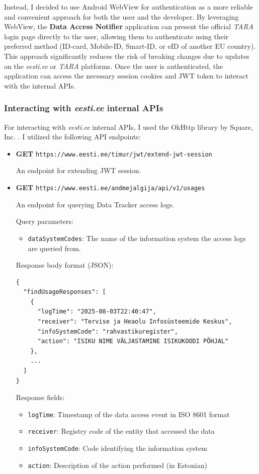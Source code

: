 Instead, I decided to use Android WebView for authentication as a more reliable and convenient approach for both the user and the developer. By leveraging WebView, the \textbf{Data Access Notifier} application can present the official \textit{TARA} login page directly to the user, allowing them to authenticate using their preferred method (ID-card, Mobile-ID, Smart-ID, or eID of another EU country). This approach significantly reduces the risk of breaking changes due to updates on the \textit{eesti.ee} or \textit{TARA} platforms. Once the user is authenticated, the application can access the necessary session cookies and JWT token to interact with the internal APIs.

\subsubsection{Interacting with \textit{eesti.ee} internal APIs}
For interacting with \textit{eesti.ee} internal APIs, I used the OkHttp library by Square, Inc. \cite{okhttp-library}. I utilized the following API endpoints:

\begin{itemize}
    \item \textbf{GET} \texttt{https://www.eesti.ee/timur/jwt/extend-jwt-session}
    
    An endpoint for extending JWT session.
    
    \item \textbf{GET} \texttt{https://www.eesti.ee/andmejalgija/api/v1/usages}
    
    An endpoint for querying Data Tracker access logs.
    
    Query parameters:
    \begin{itemize}
        \item \texttt{dataSystemCodes}: The name of the information system the access logs are queried from.
    \end{itemize}
    
    \samepage
    Response body format (JSON):
    \begin{small}
    \begin{verbatim}
{
  "findUsageResponses": [
    {
      "logTime": "2025-08-03T22:40:47",
      "receiver": "Tervise ja Heaolu Infosüsteemide Keskus",
      "infoSystemCode": "rahvastikuregister",
      "action": "ISIKU NIME VÄLJASTAMINE ISIKUKOODI PÕHJAL"
    },
    ...
  ]
}
    \end{verbatim}
    \end{small}
    
    Response fields:
    \begin{itemize}
        \item \texttt{logTime}: Timestamp of the data access event in ISO 8601 format
        \item \texttt{receiver}: Registry code of the entity that accessed the data
        \item \texttt{infoSystemCode}: Code identifying the information system
        \item \texttt{action}: Description of the action performed (in Estonian)
    \end{itemize}
\end{itemize}


